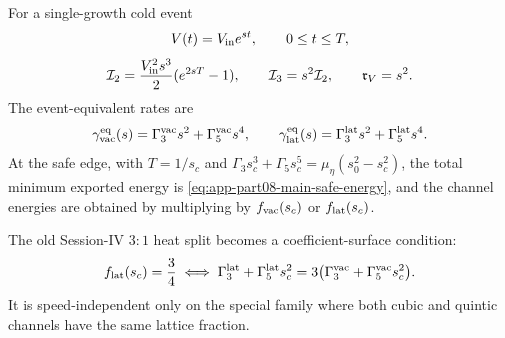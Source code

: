 For a single-growth cold event
\begin{equation}
\label{eq:app-part08-stage252-single-growth}
V(t)=V_{\rm in}e^{st},
\qquad
0\le t\le T,
\end{equation}
\begin{equation}
\label{eq:app-part08-stage252-single-growth-integrals}
\mathcal I_2=\frac{V_{\rm in}^{2}s^3}{2}(e^{2sT}-1),
\qquad
\mathcal I_3=s^2\mathcal I_2,
\qquad
\mathfrak r_V=s^2.
\end{equation}
The event-equivalent rates are
\begin{equation}
\label{eq:app-part08-stage252-equivalent-rates}
\gamma_{\rm vac}^{\rm eq}(s)=\Gamma_3^{\rm vac}s^2+\Gamma_5^{\rm vac}s^4,
\qquad
\gamma_{\rm lat}^{\rm eq}(s)=\Gamma_3^{\rm lat}s^2+\Gamma_5^{\rm lat}s^4.
\end{equation}
At the safe edge, with \(T=1/s_c\) and \(\Gamma_3s_c^3+\Gamma_5s_c^5=\mu_\eta(s_0^2-s_c^2)\), the total minimum exported energy is \cref{eq:app-part08-main-safe-energy}, and the channel energies are obtained by multiplying by \(f_{\rm vac}(s_c)\) or \(f_{\rm lat}(s_c)\).

The old Session-IV \(3:1\) heat split becomes a coefficient-surface condition:
\begin{equation}
\label{eq:app-part08-stage252-three-one-surface}
f_{\rm lat}(s_c)=\frac34
\iff
\Gamma_3^{\rm lat}+\Gamma_5^{\rm lat}s_c^2
=
3\bigl(\Gamma_3^{\rm vac}+\Gamma_5^{\rm vac}s_c^2\bigr).
\end{equation}
It is speed-independent only on the special family where both cubic and quintic channels have the same lattice fraction.
